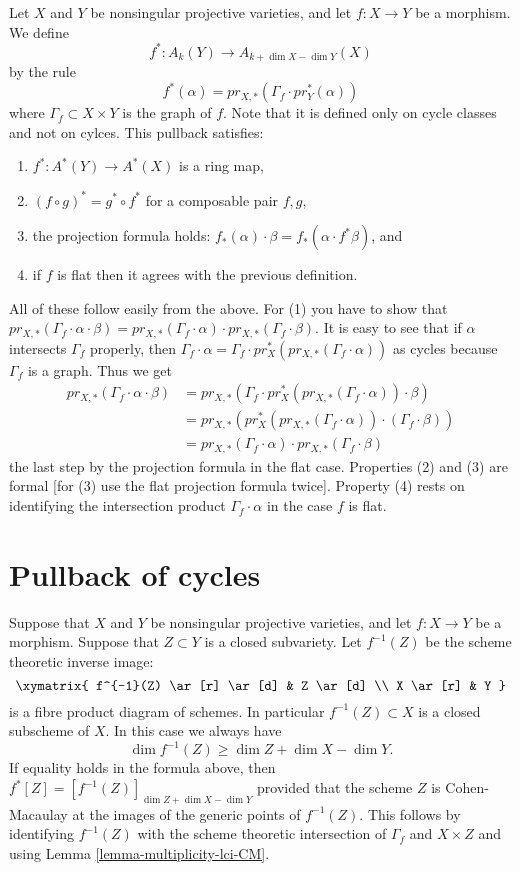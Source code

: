 \noindent
Let $X$ and $Y$ be nonsingular projective varieties,
and let $f : X \to Y$ be a morphism. We define
$$
f^* : A_k(Y) \to A_{k+\dim X - \dim Y}(X)
$$
by the rule
$$
f^*(\alpha) = pr_{X,*}(\Gamma_f \cdot pr_{Y}^*(\alpha))
$$
where $\Gamma_f \subset X\times Y$ is the graph of $f$.
Note that it is defined only on cycle classes and not
on cylces. This pullback satisfies:
\begin{enumerate}
\item $f^* : A^*(Y) \to A^*(X)$ is a ring map,
\item $(f \circ g)^* = g^* \circ f^*$ for a composable
pair $f,g$,
\item the projection formula holds: $f_*(\alpha) \cdot \beta =
f_*( \alpha \cdot f^*\beta)$, and
\item if $f$ is flat then it agrees with the previous definition.
\end{enumerate}
All of these follow easily from the above. For (1) you have to show that
$pr_{X,*}( \Gamma_f \cdot \alpha \cdot \beta) =
pr_{X,*}(\Gamma_f \cdot \alpha) \cdot
pr_{X,*}(\Gamma_f \cdot \beta)$. It is easy to see that
if $\alpha$ intersects $\Gamma_f$ properly, then
$\Gamma_f \cdot \alpha =
\Gamma_f \cdot pr_X^*(pr_{X,*}(\Gamma_f \cdot \alpha))$ as cycles
because $\Gamma_f$ is a graph. Thus we get
\begin{align*}
pr_{X,*}( \Gamma_f \cdot \alpha \cdot \beta)
& = pr_{X,*}( \Gamma_f \cdot
pr_X^*(pr_{X,*}(\Gamma_f \cdot \alpha)) \cdot \beta) \\
& =
pr_{X,*}( pr_X^*(pr_{X,*}(\Gamma_f \cdot \alpha))
\cdot (\Gamma_f \cdot \beta)) \\
& =
pr_{X,*}(\Gamma_f \cdot \alpha) \cdot pr_{X,*}(\Gamma_f \cdot \beta)
\end{align*}
the last step by the projection formula in the flat case. Properties
(2) and (3) are formal [for (3) use the flat projection formula twice].
Property (4) rests on identifying the intersection product
$\Gamma_f \cdot \alpha$ in the case $f$ is flat.


\section{Pullback of cycles}
\label{section-pullback-cycles}

\noindent
Suppose that $X$ and $Y$ be nonsingular
projective varieties, and let $f : X \to Y$ be a morphism.
Suppose that $Z \subset Y$ is a closed subvariety. Let $f^{-1}(Z)$
be the scheme theoretic inverse image:
$$
\xymatrix{
f^{-1}(Z) \ar[r] \ar[d] & Z \ar[d] \\
X \ar[r] & Y
}
$$
is a fibre product diagram of schemes. In particular $f^{-1}(Z) \subset X$
is a closed subscheme of $X$. In this case we always have
$$
\dim f^{-1}(Z) \geq \dim Z + \dim X - \dim Y.
$$
If equality holds in the formula above, then
$f^*[Z] = [f^{-1}(Z)]_{\dim Z + \dim X - \dim Y}$
provided that the scheme $Z$ is Cohen-Macaulay at the images
of the generic points of $f^{-1}(Z)$. This follows by identifying
$f^{-1}(Z)$ with the scheme theoretic intersection of $\Gamma_f$
and $X \times Z$ and using Lemma \ref{lemma-multiplicity-lci-CM}.












